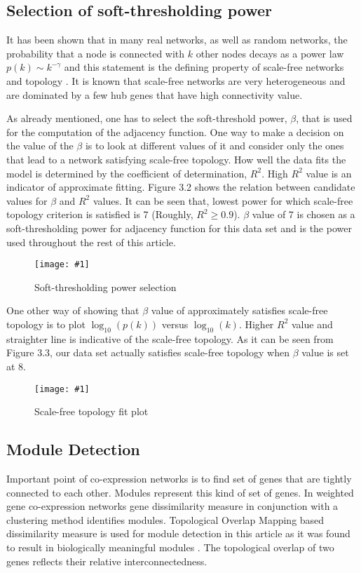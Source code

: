\documentclass{ba-kecs}
\numberwithin{figure}{section}
\numberwithin{equation}{section}
\newcommand{\dkepic}[2]{ %
	\begin{figure}[H] %
	\centerline{\texttt{[image: \#1]}}
	\caption{#2}
	\label{#1}
	\end{figure}
}
\begin{document}
\subsection{Selection of soft-thresholding power}

It has been shown that in many real networks, as well as random networks, the probability that a node is connected with $k$ other nodes decays as a power law $p(k) \sim k ^{-\gamma}$ and this statement is the defining property of scale-free networks and topology \cite{barabas1999}. It is known that scale-free networks are very heterogeneous and are dominated by a few hub genes that have high connectivity value.

As already mentioned, one has to select the soft-threshold power, $\beta$, that is used for the computation of the adjacency function. One way to make a decision on the value of the $\beta$ is to look at different values of it and consider only the ones that lead to a network satisfying scale-free topology. How well the data fits the model is determined by the coefficient of determination, $R^2$. High $R^2$ value is an indicator of approximate fitting. Figure 3.2 shows the relation between candidate values for $\beta$ and $R^2$ values. It can be seen that, lowest power for which scale-free topology criterion is satisfied is 7 (Roughly, $R^2 \geq 0.9$). $\beta$ value of 7 is chosen as a soft-thresholding power for adjacency function for this data set and is the power used throughout the rest of this article.

\dkepic{powerNew}{Soft-thresholding power selection}


One other way of showing that $\beta$ value of approximately satisfies scale-free topology is to plot $\log_10(p(k))$ versus $\log_10(k)$. Higher $R^2$ value and straighter line is indicative of the scale-free topology. As it can be seen from Figure 3.3, our data set actually satisfies scale-free topology when $\beta$ value is set at 8.


\dkepic{scaleFreeNew}{Scale-free topology fit plot}

\subsection{Module Detection}
Important point of co-expression networks is to find set of genes that are tightly connected to each other. Modules represent this kind of set of genes. In weighted gene co-expression networks gene dissimilarity measure in conjunction with a clustering method identifies modules. Topological Overlap Mapping based dissimilarity measure is used for module detection in this article as it was found to result in biologically meaningful modules \cite{ravasz2002}. The topological overlap of two genes reflects their relative interconnectedness.
\end{document}
